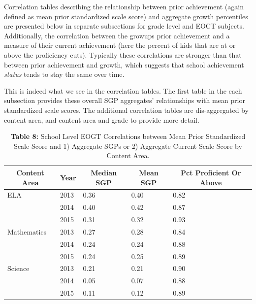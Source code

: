 \documentclass[12pt]{article}
\begin{document}
Correlation tables describing the relationship between prior achievement
(again defined as mean prior standardized scale score) and aggregate
growth percentiles are presented below in separate subsections for grade
level and EOCT subjects. Additionally, the correlation between the
growups prior achievement and a measure of their current achievement
(here the percent of kids that are at or above the proficiency cuts).
Typically these correlations are stronger than that between prior
achievement and growth, which suggests that school achievement
\emph{status} tends to stay the same over time.

This is indeed what we see in the correlation tables. The first table in
the each subsection provides these overall SGP aggregates' relationships
with mean prior standardized scale scores. The additional correlation
tables are dis-aggregated by content area, and content area and grade to
provide more detail.

\begin{table}[H]
\caption*{\textbf{Table 8:} School Level EOGT Correlations between Mean Prior Standardized Scale Score and 1) Aggregate SGPs or 2) Aggregate Current Scale Score by Content Area.\label{table8}} 
\begin{center}
\begin{tabular}{lllll}
\hline\hline
\multicolumn{1}{c}{Content Area}&\multicolumn{1}{c}{Year}&\multicolumn{1}{c}{Median SGP}&\multicolumn{1}{c}{Mean SGP}&\multicolumn{1}{c}{Pct Proficient Or Above}\tabularnewline
\hline
ELA&2013&0.36&0.40&0.82\tabularnewline
&2014&0.40&0.42&0.87\tabularnewline
&2015&0.31&0.32&0.93\tabularnewline
Mathematics&2013&0.27&0.28&0.84\tabularnewline
&2014&0.24&0.24&0.88\tabularnewline
&2015&0.24&0.25&0.89\tabularnewline
Science&2013&0.21&0.21&0.90\tabularnewline
&2014&0.05&0.07&0.88\tabularnewline
&2015&0.11&0.12&0.89\tabularnewline
\hline
\end{tabular}\end{center}

\end{table}
\end{document}
